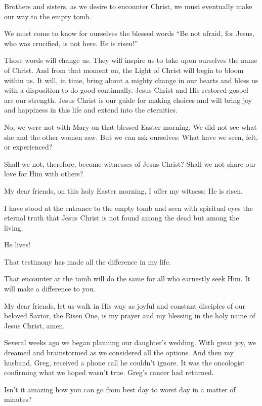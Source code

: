 \documentclass[letterpaper, 11pt]{report}
\newcommand{\speaker}{}
\newcommand{\talk}{}
\newcommand{\talkdatestr}{}
\newcommand{\setspeaker}[1]{\renewcommand{\speaker}{#1}}
\newcommand{\settalk}[1]{\renewcommand{\talk}{#1}}
\newcommand{\talkheading}[2]{%
    \vspace{1em}
    \noindent{\huge\bfseries #1}
    \par\nopagebreak\vspace{0.25em}
    \noindent{\normalsize\bfseries #2\ifx\talkdatestr\empty\else,\ \talkdatestr\fi}
    \par\nopagebreak\vspace{0.5em}
}
\begin{document}
Brothers and sisters, as we desire to encounter Christ, we must eventually make our way to the empty tomb.

We must come to know for ourselves the blessed words “Be not afraid, for Jesus, who was crucified, is not here. He is risen!”

Those words will change us. They will inspire us to take upon ourselves the name of Christ. And from that moment on, the Light of Christ will begin to bloom within us. It will, in time, bring about a mighty change in our hearts and bless us with a disposition to do good continually. Jesus Christ and His restored gospel are our strength. Jesus Christ is our guide for making choices and will bring joy and happiness in this life and extend into the eternities.

No, we were not with Mary on that blessed Easter morning. We did not see what she and the other women saw. But we can ask ourselves: What have we seen, felt, or experienced?

Shall we not, therefore, become witnesses of Jesus Christ? Shall we not share our love for Him with others?

My dear friends, on this holy Easter morning, I offer my witness: He is risen.

I have stood at the entrance to the empty tomb and seen with spiritual eyes the eternal truth that Jesus Christ is not found among the dead but among the living.

He lives!

That testimony has made all the difference in my life.

That encounter at the tomb will do the same for all who earnestly seek Him. It will make a difference to you.

My dear friends, let us walk in His way as joyful and constant disciples of our beloved Savior, the Risen One, is my prayer and my blessing in the holy name of Jesus Christ, amen.

\newpage
\settalk{Best Days and Worst Days}
\setspeaker{Emily Belle Freeman}
\talkheading{Best Days and Worst Days}{Emily Belle Freeman}

Several weeks ago we began planning our daughter’s wedding. With great joy, we dreamed and brainstormed as we considered all the options. And then my husband, Greg, received a phone call he couldn’t ignore. It was the oncologist confirming what we hoped wasn’t true. Greg’s cancer had returned.

Isn’t it amazing how you can go from best day to worst day in a matter of minutes?
\end{document}
